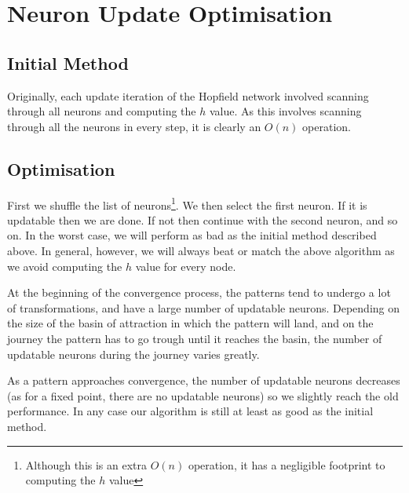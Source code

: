 \chapter{Neuron Update Optimisation}


\section{Initial Method}
Originally, each update iteration of the Hopfield network involved scanning through all neurons and computing the $h$ value. As this involves scanning through all the neurons in every step, it is clearly an $O(n)$ operation.

\section{Optimisation}
First we shuffle the list of neurons\footnote{Although this is an extra $O(n)$ operation, it has a negligible footprint to computing the $h$ value}. We then select the first neuron. If it is updatable then we are done. If not then continue with the second neuron, and so on. In the worst case, we will perform as bad as the initial method described above. In general, however, we will always beat or match the above algorithm as we avoid computing the $h$ value for every node.



At the beginning of the convergence process, the patterns tend to undergo a lot of transformations, and have a large number of updatable neurons. Depending on the size of the basin of attraction in which the pattern will land, and on the journey the pattern has to go trough until it reaches the basin, the number of updatable neurons during the journey varies greatly.

As a pattern approaches convergence, the number of updatable neurons decreases (as for a fixed point, there are no updatable neurons) so we slightly reach the old performance. In any case our algorithm is still at least as good as the initial method.
